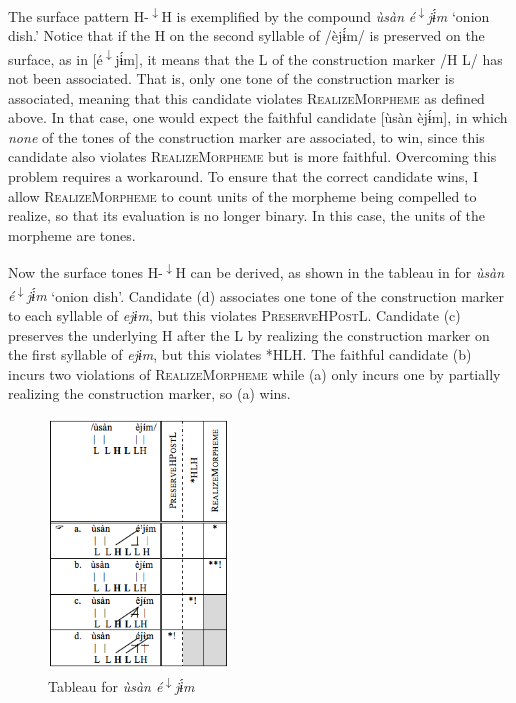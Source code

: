 \documentclass[output=paper]{langscibook}
\begin{document}
The surface pattern H-\textsuperscript{$\downarrow$}H is exemplified by the compound \textit{ùsàn} \textit{é\textsuperscript{$\downarrow$}}\textit{jɨ́m} ‘onion dish.’ Notice that if the H on the second syllable of /èjɨ́m/ is preserved on the surface, as in [é\textsuperscript{$\downarrow$}jɨ́m], it means that the L of the construction marker /H L/ has not been associated. That is, only one tone of the construction marker is associated, meaning that this candidate violates \textsc{RealizeMorpheme} as defined above. In that case, one would expect the faithful candidate [ùsàn èjɨ́m], in which \textit{none} of the tones of the construction marker are associated, to win, since this candidate also violates \textsc{RealizeMorpheme} but is more faithful. Overcoming this problem requires a workaround. To ensure that the correct candidate wins, I allow \textsc{RealizeMorpheme} to count units of the morpheme being compelled to realize, so that its evaluation is no longer binary. In this case, the units of the morpheme are tones. 

Now the surface tones H-\textsuperscript{$\downarrow$}H can be derived, as shown in the tableau in  for \textit{ùsàn} \textit{é\textsuperscript{$\downarrow$}}\textit{jɨ́m} ‘onion dish’. Candidate (d) associates one tone of the construction marker to each syllable of \textit{ejɨm}, but this violates \textsc{PreserveHPostL}. Candidate (c) preserves the underlying H after the L by realizing the construction marker on the first syllable of \textit{ejɨm}, but this violates *HLH. The faithful candidate (b) incurs two violations of \textsc{RealizeMorpheme} while (a) only incurs one by partially realizing the construction marker, so (a) wins.\largerpage

\begin{figure}[h]
\includegraphics[width=48mm]{figures/glewwe-img7.png}
\caption{Tableau for \textit{ùsàn é}\textup{\textsuperscript{$\downarrow$}}\textit{jɨ́m}}
\label{fig:glewwe:8}
\end{figure}
\end{document}
